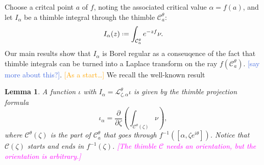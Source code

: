 \documentclass{article}
\newcommand{\fracderiv}[3]{\partial^{#1}_{#2, #3}}
\newcommand*{\defeq}{\mathrel{\vcenter{\baselineskip0.5ex \lineskiplimit0pt
                     \hbox{\scriptsize.}\hbox{\scriptsize.}}}%
                     =}
\newcommand{\laplace}{\mathcal{L}}
\theoremstyle{definition}
\newtheorem{remark}[definition]{Remark}
\theoremstyle{plain}
\newtheorem{lemma}[definition]{Lemma}
\newenvironment{verify}{\color{ForestGreen}}{\color{black}}
\begin{document}
Choose a critcal point $a$ of $f$, noting the associated critical value $\alpha = f(a)$, and let $I_\alpha$ be a thimble integral through the thimble $\mathcal{C}_a^\theta$:
\begin{equation}
I_\alpha(z)\defeq\int_{\mathcal{C}_a^\theta}e^{-zf}\nu.
\end{equation}
Our main results show that $I_\alpha$ is Borel regular as a conseuqence of the fact that thimble integrals can be turned into a Laplace transform on the ray $f(\mathcal{C}_a^\theta)$. \textcolor{RoyalBlue}{[say more about this?]}. \textcolor{orange}{[As a start\ldots]} We recall the well-known result\color{black}
\begin{lemma}\label{lem:thimble_proj_formula}
A function $\iota$ with $I_\alpha = \laplace_{\zeta, \alpha}^\theta \iota$ is given by the {\em thimble projection formula}
\begin{equation}\label{eqn:formula}
\iota_\alpha = \frac{\partial}{\partial \zeta} \left( \int_{\mathcal{C}^\theta(\zeta)}\nu \right),
\end{equation}
where $\mathcal{C}^\theta(\zeta)$ is the part of $\mathcal{C}_a^\theta$ that goes through $f^{-1}([\alpha,\zeta e^{i\theta}])$. Notice that $\mathcal{C}(\zeta)$ starts and ends in $f^{-1}(\zeta)$. \textcolor{magenta}{[The thimble $\mathcal{C}$ needs an orientation, but the orientation is arbitrary.]}
\end{lemma}
\end{document}
